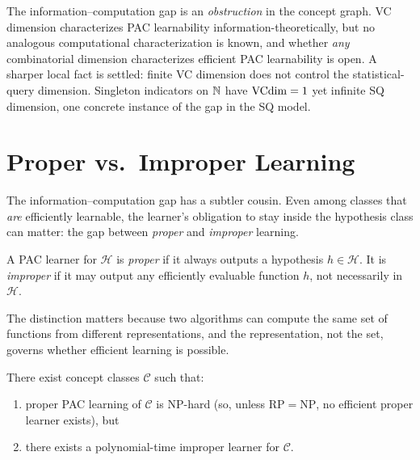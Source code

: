 \begin{obstbox}
The information--computation gap is an \emph{obstruction} in the concept
graph.  VC dimension characterizes PAC learnability information-theoretically,
but no analogous computational characterization is known, and whether \emph{any}
combinatorial dimension characterizes efficient PAC learnability is open.  A
sharper local fact is settled: finite VC dimension does not control the
statistical-query dimension.  Singleton indicators on $\mathbb{N}$ have $\mathrm{VCdim} = 1$ yet
infinite SQ dimension,
one concrete instance of the gap in the SQ model.
\end{obstbox}



\section{Proper vs.\ Improper Learning}
\label{sec:proper-improper-comput}

The information--computation gap has a subtler cousin.  Even among classes that
\emph{are} efficiently learnable, the learner's obligation to stay inside the
hypothesis class can matter: the gap between \emph{proper} and \emph{improper}
learning.

\begin{defn}
\label{def:proper-improper}
A PAC learner for $\mathcal{H}$ is \emph{proper} if it always outputs a
hypothesis $h \in \mathcal{H}$.  It is \emph{improper} if it may output any
efficiently evaluable function $h$, not necessarily in $\mathcal{H}$.
\end{defn}

The distinction matters because two algorithms can compute the same set of
functions from different representations, and the representation, not the set,
governs whether efficient learning is possible.

\begin{thm}
\label{thm:proper-improper}
There exist concept classes $\mathcal{C}$ such that:
\begin{enumerate}[leftmargin=*,nosep]
\item proper PAC learning of $\mathcal{C}$ is $\mathrm{NP}$-hard (so, unless
  $\mathrm{RP} = \mathrm{NP}$, no efficient proper learner exists), but
\item there exists a polynomial-time improper learner for $\mathcal{C}$.
\end{enumerate}
\end{thm}

